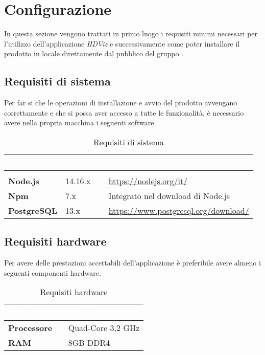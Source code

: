 \section{Configurazione}
In questa sezione vengono trattati in primo luogo i requisiti minimi necessari per l'utilizzo dell'applicazione \textit{HDViz} e successivamente come poter installare il prodotto in locale direttamente dal  pubblico  del gruppo \Gruppo{}.  
\subsection{Requisiti di sistema}
Per far si che le operazioni di installazione e avvio del prodotto avvengano correttamente e che si possa aver accesso a tutte le funzionalità, è necessario avere nella propria macchina i seguenti software.
{
\setlength\arrayrulewidth{0.95pt}
\renewcommand{\arraystretch}{1.5}
\begin{longtable}{C{3cm} C{3cm} C{9cm}}

\textcolor{white}{\textbf{Software}}&
\textcolor{white}{\textbf{Versione}}&
\textcolor{white}{\textbf{Riferimento per il downlaod}} \\
\endfirsthead
{}\\
\endfoot
{}\caption{Requisiti di sistema}
\endlastfoot
	
	\textbf{Node.js} &
	14.16.x &
	\textcolor{blue}{\url{https://nodejs.org/it/}} \\
 
	\textbf{Npm} & 
	7.x &
	Integrato nel download di Node.js \\
	
	\textbf{PostgreSQL} &
	13.x &
	\textcolor{blue}{\url{https://www.postgresql.org/download/}} \\
\end{longtable}	

}
\subsection{Requisiti hardware}
Per avere delle prestazioni accettabili dell'applicazione è preferibile avere almeno i seguenti componenti hardware.
{
\setlength\arrayrulewidth{0.95pt}
\renewcommand{\arraystretch}{1.5}
\begin{longtable}{C{4cm} C{4cm}}

\textcolor{white}{\textbf{Componente}}&
\textcolor{white}{\textbf{Requisito}} \\
\endfirsthead
\endfoot
{}\caption{Requisiti hardware}
\endlastfoot
	
	\textbf{Processore} &
	 Quad-Core 3,2 GHz \\
 
	\textbf{RAM} & 
	8GB DDR4 \\

\end{longtable}	
}

